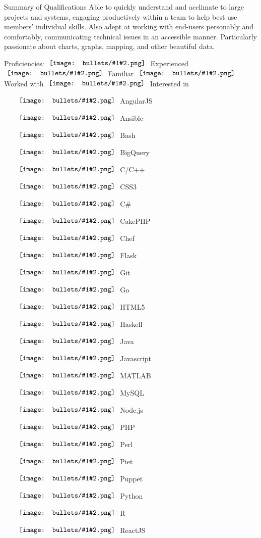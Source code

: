 \documentclass[letterpaper,10pt]{article}
\newcommand{\gbullet}[2][circle]{
  \vcenter{\hbox{
    \texttt{[image: bullets/\#1\#2.png]}
    \vspace{2pt}
  }}
}
\begin{document}
\begin{res_section}{Summary of Qualifications}
  \vskip 4pt Able to quickly understand and acclimate to large projects and systems, engaging productively within a team to help best use members' individual skills.
  Also adept at working with end-users personably and comfortably, communicating technical issues in an accessible manner.
  Particularly passionate about charts, graphs, mapping, and other beautiful data.
\begin{res_content}{Proficiencies: \small \hfill $\gbullet{4}$ Experienced $\gbullet{3}$ Familiar $\gbullet{2}$ Worked with $\gbullet{1}$ Interested in}
  \rmfamily \normalsize
  \def \multicolsep {4pt}
  \setlength{\columnsep}{2pt}
  \begin{multicols}{6}
  \begin{itemize}[labelsep=0em]
    \item[$\gbullet{4}$] AngularJS
    \item[$\gbullet{3}$] Ansible
    \item[$\gbullet{3}$] Bash
    \item[$\gbullet{3}$] BigQuery
    \item[$\gbullet{3}$] C/C++
    \item[$\gbullet{4}$] CSS3
    \item[$\gbullet{3}$] C\#
    \item[$\gbullet{4}$] CakePHP
    \item[$\gbullet{3}$] Chef
    \item[$\gbullet{3}$] Flask
    \item[$\gbullet{4}$] Git
    \item[$\gbullet{1}$] Go
    \item[$\gbullet{4}$] HTML5
    \item[$\gbullet{2}$] Haskell
    \item[$\gbullet{3}$] Java
    \item[$\gbullet{4}$] Javascript
    \item[$\gbullet{2}$] MATLAB
    \item[$\gbullet{4}$] MySQL
    \item[$\gbullet{3}$] Node.js
    \item[$\gbullet{4}$] PHP
    \item[$\gbullet{3}$] Perl
    \item[$\gbullet{2}$] Piet
    \item[$\gbullet{4}$] Puppet
    \item[$\gbullet{4}$] Python
    \item[$\gbullet{3}$] R
    \item[$\gbullet{3}$] ReactJS

\end{itemize}
\end{multicols}
\end{res_content}
\end{res_section}
\end{document}
